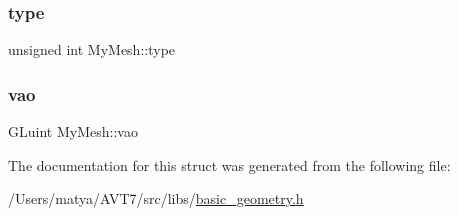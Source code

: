 \subsubsection{\texorpdfstring{type}{type}}
{\footnotesize\ttfamily unsigned int My\+Mesh\+::type}

\mbox{\label{struct_my_mesh_a2e84e6ea2bf5ce3aa936e456577e7721}} 
\subsubsection{\texorpdfstring{vao}{vao}}
{\footnotesize\ttfamily G\+Luint My\+Mesh\+::vao}



The documentation for this struct was generated from the following file\+:\begin{DoxyCompactItemize}
\item 
/\+Users/matya/\+A\+V\+T7/src/libs/\hyperlink{basic__geometry_8h}{basic\+\_\+geometry.\+h}\end{DoxyCompactItemize}
